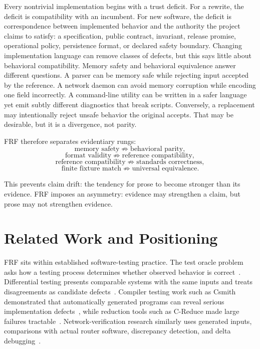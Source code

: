 \documentclass[11pt,a4paper]{article}
\newcommand{\frf}{\textsc{FRF}}
\begin{document}
Every nontrivial implementation begins with a trust deficit. For a rewrite, the deficit is compatibility with an incumbent. For new software, the deficit is correspondence between implemented behavior and the authority the project claims to satisfy: a specification, public contract, invariant, release promise, operational policy, persistence format, or declared safety boundary. Changing implementation language can remove classes of defects, but this says little about behavioral compatibility. Memory safety and behavioral equivalence answer different questions. A parser can be memory safe while rejecting input accepted by the reference. A network daemon can avoid memory corruption while encoding one field incorrectly. A command-line utility can be written in a safer language yet emit subtly different diagnostics that break scripts. Conversely, a replacement may intentionally reject unsafe behavior the original accepts. That may be desirable, but it is a divergence, not parity.

\frf{} therefore separates evidentiary rungs:
\[
\text{memory safety} \not\Rightarrow \text{behavioral parity},
\]
\[
\text{format validity} \not\Rightarrow \text{reference compatibility},
\]
\[
\text{reference compatibility} \not\Rightarrow \text{standards correctness},
\]
\[
\text{finite fixture match} \not\Rightarrow \text{universal equivalence}.
\]

This prevents claim drift: the tendency for prose to become stronger than its evidence. \frf{} imposes an asymmetry: evidence may strengthen a claim, but prose may not strengthen evidence.

\section{Related Work and Positioning}
\label{sec:related}

\frf{} sits within established software-testing practice. The test oracle problem asks how a testing process determines whether observed behavior is correct~\cite{barr2015oracle}. Differential testing presents comparable systems with the same inputs and treats disagreements as candidate defects~\cite{mckeeman1998differential}. Compiler testing work such as Csmith demonstrated that automatically generated programs can reveal serious implementation defects~\cite{yang2011csmith}, while reduction tools such as C-Reduce made large failures tractable~\cite{regehr2012creduce}. Network-verification research similarly uses generated inputs, comparisons with actual router software, discrepancy detection, and delta debugging~\cite{metha2021}.
\end{document}
